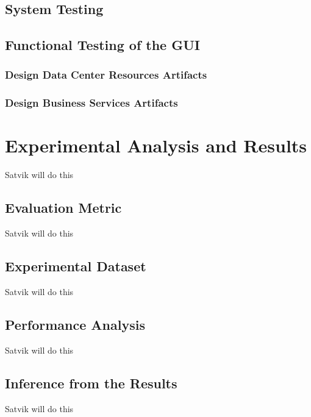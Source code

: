 \documentclass[12pt]{report}
\begin{document}
\section{System Testing}
\section{Functional Testing of the GUI}
\subsection{Design Data Center Resources Artifacts}
\subsection{Design Business Services Artifacts}




\pagestyle{fancy}
\chead{}
\rfoot{\small{\thepage}}
\renewcommand{\headrulewidth}{0.4pt}
\renewcommand{\footrulewidth}{0.4pt}
\chapter{Experimental Analysis and Results}
Satvik will do this
\section{Evaluation Metric}
Satvik will do this
\section{Experimental Dataset}
Satvik will do this
\section{Performance Analysis}
Satvik will do this
\section{Inference from the Results}
Satvik will do this



\pagestyle{fancy}
\chead{}
\rfoot{\small{\thepage}}
\renewcommand{\headrulewidth}{0.4pt}
\renewcommand{\footrulewidth}{0.4pt}
\end{document}
